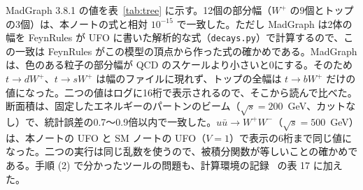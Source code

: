 \documentclass[a4paper,10pt]{ltjsarticle}
\begin{document}
MadGraph 3.8.1 の値を表~\ref{tab:tree} に示す。12個の部分幅（$W^+$ の9個とトップの3個）は、本ノートの式と相対 $10^{-15}$ で一致した。ただし MadGraph は2体の幅を FeynRules が UFO に書いた解析的な式（\texttt{decays.py}）で計算するので、この一致は FeynRules がこの模型の頂点から作った式の確かめである。MadGraph は、色のある粒子の部分幅が QCD のスケールより小さいと0にする。そのため $t\to dW^+$、$t\to sW^+$ は幅のファイルに現れず、トップの全幅は $t\to bW^+$ だけの値になった。二つの値はログに16桁で表示されるので、そこから読んで比べた。断面積は、固定したエネルギーのパートンのビーム（$\sqrt s=200$~GeV、カットなし）で、統計誤差の0.7〜0.9倍以内で一致した。$u\bar u\to W^+W^-$（$\sqrt s=500$~GeV）は、本ノートの UFO と SM ノートの UFO（$V=1$）で表示の6桁まで同じ値になった。二つの実行は同じ乱数を使うので、被積分関数が等しいことの確かめである。手順 (2) で分かったツールの問題も、計算環境の記録~\cite{env} の表 17 に加えた。
\end{document}
